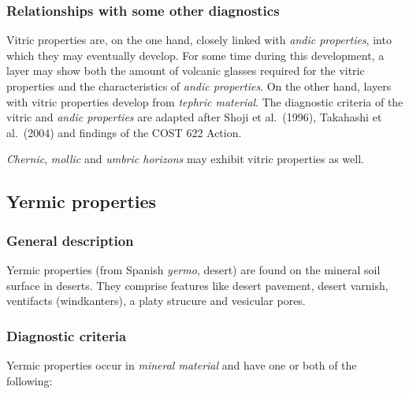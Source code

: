 \documentclass[
  letterpaper,
  DIV=11,
  numbers=noendperiod]{scrreprt}
\begin{document}
\hypertarget{relationships-with-some-other-diagnostics-50}{%
\subsubsection{Relationships with some other
diagnostics}\label{relationships-with-some-other-diagnostics-50}}

Vitric properties are, on the one hand, closely linked with \emph{andic
properties}, into which they may eventually develop. For some time
during this development, a layer may show both the amount of volcanic
glasses required for the vitric properties and the characteristics of
\emph{andic properties}. On the other hand, layers with vitric
properties develop from \emph{tephric material}. The diagnostic criteria
of the vitric and \emph{andic properties} are adapted after Shoji et
al.~(1996), Takahashi et al.~(2004) and findings of the COST 622 Action.

\emph{Chernic}, \emph{mollic} and \emph{umbric horizons} may exhibit
vitric properties as well.

\hypertarget{yermic-properties}{%
\subsection{Yermic properties}\label{yermic-properties}}

\hypertarget{general-description-54}{%
\subsubsection{General description}\label{general-description-54}}

Yermic properties (from Spanish \emph{yermo}, desert) are found on the
mineral soil surface in deserts. They comprise features like desert
pavement, desert varnish, ventifacts (windkanters), a platy strucure and
vesicular pores.

\hypertarget{diagnostic-criteria-56}{%
\subsubsection{Diagnostic criteria}\label{diagnostic-criteria-56}}

Yermic properties occur in \emph{mineral material} and have one or both
of the following:
\end{document}

